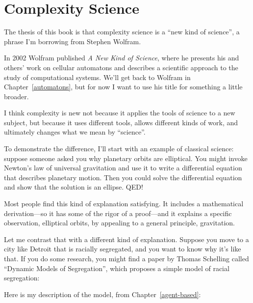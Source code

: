 \documentclass[12pt]{book}
\theoremstyle{exercise}
\begin{document}
\mainmatter

\chapter{Complexity Science}
\label{overview}

The thesis of this book is that complexity science is a ``new
kind of science'', a phrase I'm borrowing from Stephen Wolfram.

In 2002 Wolfram published {\em A New Kind of Science}, where he
presents his and others' work on cellular automatons and describes a
scientific approach to the study of computational systems.  We'll get
back to Wolfram in Chapter~\ref{automatons}, but for now I want
to use his title for something a little broader.


I think complexity is new not because
it applies the tools of science to a new subject, but because it
uses different tools, allows different kinds of work, and ultimately
changes what we mean by ``science''.

To demonstrate the difference, I'll start with an example of classical
science: suppose someone asked you why planetary orbits are
elliptical.  You might invoke Newton's law of universal
gravitation and use it to write a differential equation that describes
planetary motion.  Then you could solve the differential equation and
show that the solution is an ellipse.  QED!


Most people find this kind of explanation satisfying.  It includes a
mathematical derivation---so it has some of the rigor of a proof---and
it explains a specific observation, elliptical orbits, by appealing to
a general principle, gravitation.


Let me contrast that with a different kind of explanation.  Suppose
you move to a city like Detroit that is racially segregated, and you
want to know why it's like that.  If you do some research, you might
find a paper by Thomas Schelling called ``Dynamic Models of
Segregation'', which proposes a simple model of racial segregation:


Here is my description of the model, from Chapter~\ref{agent-based}:
\end{document}
